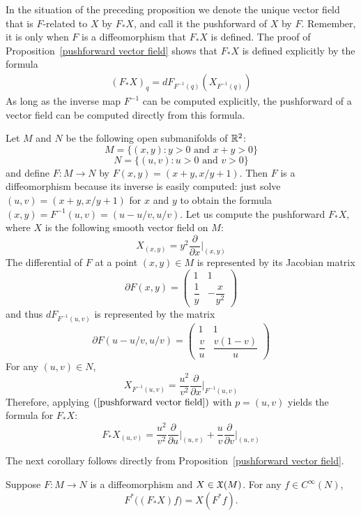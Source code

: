 In the situation of the preceding proposition we denote the unique vector field that is $F$-related to $X$ by $F_*X$, and call it the pushforward of $X$ by $F$. Remember, it is only when $F$ is a diffeomorphism that $F_*X$ is defined. The proof of Proposition~\ref{pushforward vector field} shows that $F_*X$ is defined explicitly by the formula
\begin{align}\label{pushforward vector field-1}
(F_*X)_q=dF_{F^{-1}(q)}(X_{F^{-1}(q)})
\end{align}
As long as the inverse map $F^{-1}$ can be computed explicitly, the pushforward of a vector field can be computed directly from this formula.
\begin{example}
Let $M$ and $N$ be the following open submanifolds of $\mathbb{R}^2$:
\[M=\{(x,y):y>0\text{ and }x+y>0\}\]
\[N=\{(u,v):u>0\text{ and }v>0\}\]
and define $F:M\to N$ by $F(x,y)=(x+y,x/y+1)$. Then $F$ is a diffeomorphism because its inverse is easily computed: just solve $(u,v)=(x+y,x/y+1)$ for $x$ and $y$ to obtain the formula $(x,y)=F^{-1}(u,v)=(u-u/v,u/v)$. Let us compute the pushforward $F_*X$, where $X$ is the following smooth vector field on $M$:
\[X_{(x,y)}=y^2\frac{\partial}{\partial x}\Big|_{(x,y)}\]
The differential of $F$ at a point $(x,y)\in M$ is represented by its Jacobian matrix
\[\partial F(x,y)=\begin{pmatrix}
1&1\\
\dfrac{1}{y}&-\dfrac{x}{y^2}
\end{pmatrix}\]
and thus $dF_{F^{-1}(u,v)}$ is represented by the matrix
\[\partial F(u-u/v,u/v)=\begin{pmatrix}
1&1\\
\dfrac{v}{u}&\dfrac{v(1-v)}{u}
\end{pmatrix}\]
For any $(u,v)\in N$,
\[X_{F^{-1}(u,v)}=\frac{u^2}{v^2}\frac{\partial}{\partial x}\Big|_{F^{-1}(u,v)}\]
Therefore, applying $(\ref{pushforward vector field})$ with $p=(u,v)$ yields the formula for $F_*X$:
\[F_*X_{(u,v)}=\frac{u^2}{v^2}\frac{\partial}{\partial u}\Big|_{(u,v)}+\frac{u}{v}\frac{\partial}{\partial v}\Big|_{(u,v)}\]
\end{example}
The next corollary follows directly from Proposition~\ref{pushforward vector field}.
\begin{corollary}\label{vector field push pull}
Suppose $F:M\to N$ is a diffeomorphism and $X\in\mathfrak{X}(M)$. For any $f\in C^\infty(N)$,
\[F^*\big((F_*X)f\big)=X(F^*f).\]
\end{corollary}
